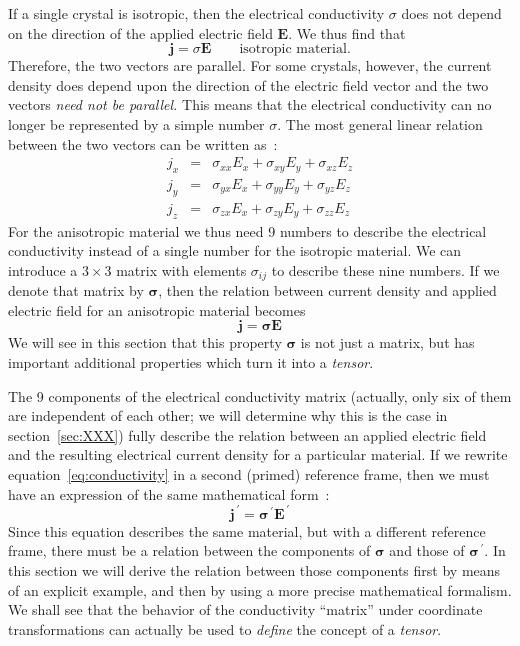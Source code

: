 If a single crystal is isotropic, then the electrical conductivity 
$\sigma$ does not depend on the direction of the applied electric 
field $\mathbf{E}$.  We thus find that
\[
	\mathbf{j}=\sigma\mathbf{E}\qquad\mbox{isotropic material}.
\]
Therefore, the two vectors are parallel.
For some crystals, however, the current density does depend upon the 
direction of the electric field vector and the two vectors 
\textit{need not be parallel.} This means that the electrical 
conductivity can no longer be represented by a simple number $\sigma$.  
The most general linear relation between the two vectors can be 
written as~:
\begin{eqnarray}
j_x &=& \sigma_{xx} E_x + \sigma_{xy} E_y + \sigma_{xz} E_z\nonumber\\
j_y &=& \sigma_{yx} E_x + \sigma_{yy} E_y + \sigma_{yz} E_z\\
j_z &=& \sigma_{zx} E_x + \sigma_{zy} E_y + \sigma_{zz} E_z\nonumber
\end{eqnarray}
For the anisotropic material we thus need 9 numbers to describe the 
electrical conductivity instead of a single number for the isotropic 
material.  We can introduce a $3\times 3$ matrix with elements 
$\sigma_{ij}$ to describe these nine numbers.  If we denote that 
matrix by $\bm{\sigma}$, then the relation between current 
density and applied electric field for an anisotropic material becomes
\[
\mathbf{j}=\bm{\sigma}\mathbf{E}
\]
We will see in this section that this property $\bm{\sigma}$ 
is not just a matrix, but has important additional properties which 
turn it into a \textit{tensor}.

The 9 components of the electrical conductivity matrix (actually, only 
six of them are independent of each other; we will determine why this 
is the case in section~\ref{sec:XXX}) fully describe the relation 
between an applied electric field and the resulting electrical current 
density for a particular material.  If we rewrite 
equation~\ref{eq:conductivity} in a second (primed) reference frame, 
then we must have an expression of the same mathematical form~:
\begin{equation}
	\mathbf{j}^{\,\prime}=\bm{\sigma}^{\,\prime}\mathbf{E}^{\,\prime}
\end{equation}
Since this equation describes the same material, but with a different 
reference frame, there must be a relation between the components of 
$\bm{\sigma}$ and those of $\bm{\sigma}^{\,\prime}$.  
In this section we will derive the relation between those components 
first by means of an explicit example, and then by using a more 
precise mathematical formalism.  We shall see that the behavior of the 
conductivity ``matrix'' under coordinate transformations can actually 
be used to \textit{define} the concept of a \textit{tensor}.

